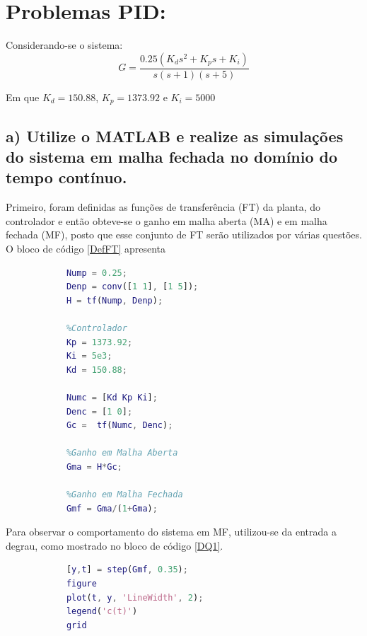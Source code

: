 \section*{Problemas PID: }
    Considerando-se o sistema:  
    \begin{equation*}
        G = \frac{0.25(K_d s^2 + K_p s +K_i)}{s(s+1)(s+5)}
    \end{equation*}
    
    Em que $K_d = 150.88$, $K_p = 1373.92$ e $K_i = 5000$
    
    \subsection*{a) Utilize o MATLAB e realize as simulações do sistema em malha 
    fechada no domínio do tempo contínuo.}

        Primeiro, foram definidas as funções de transferência (FT) da planta, do controlador e então obteve-se 
        o ganho em malha aberta (MA) e em malha fechada (MF), posto que esse conjunto de FT serão utilizados por várias
        questões. O bloco de código \ref{DefFT} apresenta

        \begin{lstlisting}[language=Matlab,label=DefFT,caption=Definindo FTs]
            %Planta
            Nump = 0.25;
            Denp = conv([1 1], [1 5]);
            H = tf(Nump, Denp);
            
            %Controlador
            Kp = 1373.92;
            Ki = 5e3;
            Kd = 150.88;
            
            Numc = [Kd Kp Ki];
            Denc = [1 0];
            Gc =  tf(Numc, Denc);
            
            %Ganho em Malha Aberta
            Gma = H*Gc;
            
            %Ganho em Malha Fechada
            Gmf = Gma/(1+Gma);
        \end{lstlisting}

        Para observar o comportamento do sistema em MF, utilizou-se da entrada a degrau, como mostrado 
        no bloco de código \ref{DQ1}. 

        \begin{lstlisting}[language=Matlab,label=DQ1,caption=Resposta ao degrau]
            %% Q a)
            [y,t] = step(Gmf, 0.35);
            figure
            plot(t, y, 'LineWidth', 2);
            legend('c(t)')
            grid        
        \end{lstlisting}

